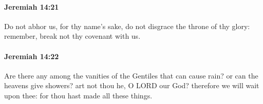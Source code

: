 		\paragraph{Jeremiah 14:21} %
			\label{JEREMIAH-14-21}

			Do not abhor us, for thy name’s sake, do not disgrace the throne of thy glory: remember, break not thy covenant with us.


		\paragraph{Jeremiah 14:22} %
			\label{JEREMIAH-14-22}

			Are there any among the vanities of the Gentiles that can cause rain? or can the heavens give showers? art not thou he, O LORD our God? therefore we will wait upon thee: for thou hast made all these things.

